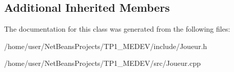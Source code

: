 \subsection*{Additional Inherited Members}


The documentation for this class was generated from the following files\+:\begin{DoxyCompactItemize}
\item 
/home/user/\+Net\+Beans\+Projects/\+T\+P1\+\_\+\+M\+E\+D\+E\+V/include/Joueur.\+h\item 
/home/user/\+Net\+Beans\+Projects/\+T\+P1\+\_\+\+M\+E\+D\+E\+V/src/Joueur.\+cpp\end{DoxyCompactItemize}
